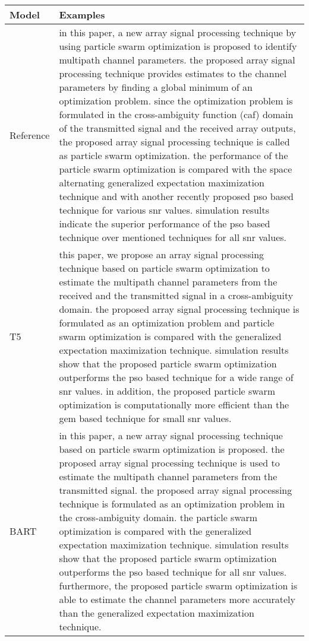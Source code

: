 \documentclass[11pt]{article}
\begin{document}
\begin{table}[t]
\begin{table*}[h]
\begin{center}
\begin{tabular}{lp{12cm}}
\toprule
 \textbf{Model}       & \textbf{Examples}    \\
\midrule
    Reference &  in this paper, a new array signal processing technique by using particle swarm optimization is proposed to identify multipath channel parameters. the proposed array signal processing technique provides estimates to the channel parameters by finding a global minimum of an optimization problem. since the optimization problem is formulated in the cross-ambiguity function (caf) domain of the transmitted signal and the received array outputs, the proposed array signal processing technique is called as particle swarm optimization. the performance of the particle swarm optimization is compared with the space alternating generalized expectation maximization technique and with another recently proposed pso based technique for various snr values. simulation results indicate the superior performance of the pso based technique over mentioned techniques for all snr values. \\
    \midrule
 T5  & this paper, we propose an array signal processing technique based on particle swarm optimization to estimate the multipath channel parameters from the received and the transmitted signal in a cross-ambiguity domain. the proposed array signal processing technique is formulated as an optimization problem and particle swarm optimization is compared with the generalized expectation maximization technique. simulation results show that the proposed particle swarm optimization outperforms the pso based technique for a wide range of snr values. in addition, the proposed particle swarm optimization is computationally more efficient than the gem based technique for small snr values. \\
 \midrule
 BART  & in this paper, a new array signal processing technique based on particle swarm optimization is proposed. the proposed array signal processing technique is used to estimate the multipath channel parameters from the transmitted signal. the proposed array signal processing technique is formulated as an optimization problem in the cross-ambiguity domain. the particle swarm optimization is compared with the generalized expectation maximization technique. simulation results show that the proposed particle swarm optimization outperforms the pso based technique for all snr values. furthermore, the proposed particle swarm optimization is able to estimate the channel parameters more accurately than the generalized expectation maximization technique. \\

\end{tabular}
\end{center}
\end{table*}
\end{table}
\end{document}
